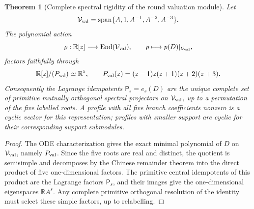 \documentclass[11pt,a4paper]{article}
\def\Dil{D}%
\numberwithin{equation}{section}
\theoremstyle{definition}
\theoremstyle{plain}
\newtheorem{theorem}[criterion]{Theorem}
\theoremstyle{remark}
\newcommand{\Dil}{\mathscr{D}}
\begin{document}
\begin{theorem}[Complete spectral rigidity of the round valuation module]
Let
\begin{equation}
\mathcal V_{\rm val}=\operatorname{span}\{A,1,A^{-1},A^{-2},A^{-3}\}.
\end{equation}
The polynomial action
\begin{equation}
\varrho:\mathbb R[z]\longrightarrow\operatorname{End}(\mathcal V_{\rm val}),
\qquad p\longmapsto p(\Dil)|_{\mathcal V_{\rm val}},
\end{equation}
factors faithfully through
\begin{equation}
\mathbb R[z]/(P_{\rm val})\simeq\mathbb R^5,
\qquad
P_{\rm val}(z)=(z-1)z(z+1)(z+2)(z+3).
\end{equation}
Consequently the Lagrange idempotents \(\mathsf P_s=e_s(\Dil)\) are the unique
complete set of primitive mutually orthogonal spectral projectors on
\(\mathcal V_{\rm val}\), up to a permutation of the five labelled roots.  A
profile with all five branch coefficients nonzero is a cyclic vector for this
representation; profiles with smaller support are cyclic for their corresponding
support submodules.
\end{theorem}
\begin{proof}
The ODE characterization gives the exact minimal polynomial of \(\Dil\) on
\(\mathcal V_{\rm val}\), namely \(P_{\rm val}\).  Since the five roots are real
and distinct, the quotient is semisimple and decomposes by the Chinese
remainder theorem into the direct product of five one-dimensional factors.  The
primitive central idempotents of this product are the Lagrange factors
\(\mathsf P_s\), and their images give the one-dimensional eigenspaces
\(\mathbb R A^s\).  Any complete primitive orthogonal resolution of the identity
must select these simple factors, up to relabelling.
\end{proof}
\end{document}
